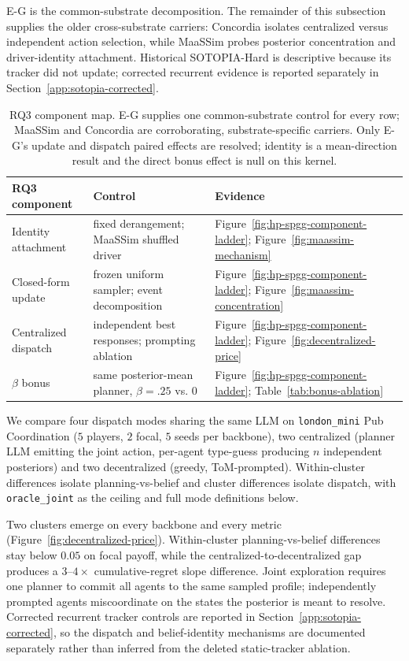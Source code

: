 E-G is the common-substrate decomposition. The remainder of this subsection supplies the older cross-substrate carriers: Concordia isolates centralized versus independent action selection, while MaaSSim probes posterior concentration and driver-identity attachment. Historical SOTOPIA-Hard is descriptive because its tracker did not update; corrected recurrent evidence is reported separately in Section~\ref{app:sotopia-corrected}.

\begin{table}[t]
\centering\scriptsize
\setlength{\tabcolsep}{2.5pt}
\begin{tabular}{@{}p{}p{}p{}@{}}
\toprule
RQ3 component & Control & Evidence \\
\midrule
Identity attachment & fixed derangement; MaaSSim shuffled driver & Figure~\ref{fig:hp-spgg-component-ladder}; Figure~\ref{fig:maassim-mechanism} \\
Closed-form update & frozen uniform sampler; event decomposition & Figure~\ref{fig:hp-spgg-component-ladder}; Figure~\ref{fig:maassim-concentration} \\
Centralized dispatch & independent best responses; prompting ablation & Figure~\ref{fig:hp-spgg-component-ladder}; Figure~\ref{fig:decentralized-price} \\
$\beta$ bonus & same posterior-mean planner, $\beta=.25$ vs. $0$ & Figure~\ref{fig:hp-spgg-component-ladder}; Table~\ref{tab:bonus-ablation} \\
\bottomrule
\end{tabular}
\caption{RQ3 component map. E-G supplies one common-substrate control for every row; MaaSSim and Concordia are corroborating, substrate-specific carriers. Only E-G's update and dispatch paired effects are resolved; identity is a mean-direction result and the direct bonus effect is null on this kernel.}
\label{tab:rq3-components}
\end{table}

We compare four dispatch modes sharing the same LLM on \texttt{london\_mini} Pub Coordination ($5$ players, $2$ focal, $5$ seeds per backbone), two centralized (planner LLM emitting the joint action, per-agent type-guess producing $n$ independent posteriors) and two decentralized (greedy, ToM-prompted). Within-cluster differences isolate planning-vs-belief and cluster differences isolate dispatch, with \texttt{oracle\_joint} as the ceiling and full mode definitions below.

Two clusters emerge on every backbone and every metric (Figure~\ref{fig:decentralized-price}). Within-cluster planning-vs-belief differences stay below $0.05$ on focal payoff, while the centralized-to-decentralized gap produces a $3$--$4\times$ cumulative-regret slope difference. Joint exploration requires one planner to commit all agents to the same sampled profile; independently prompted agents miscoordinate on the states the posterior is meant to resolve. Corrected recurrent tracker controls are reported in Section~\ref{app:sotopia-corrected}, so the dispatch and belief-identity mechanisms are documented separately rather than inferred from the deleted static-tracker ablation.

